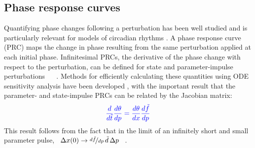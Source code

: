 \documentclass[11pt, letterpaper]{article}
\providecommand{\DIFadd}[1]{{\protect\color{blue}#1}} %
\providecommand{\DIFaddbegin}{} %
\providecommand{\DIFaddend}{} %
\begin{document}
\subsection*{Phase response curves}
Quantifying phase changes following a perturbation has been well studied and is particularly relevant for models of circadian rhythms \cite{Kramer1984, Taylor2008a}.
A phase response curve (PRC) maps the change in phase resulting from the same perturbation applied at \DIFaddbegin \DIFadd{each initial phase}\DIFaddend .
Infinitesimal PRCs, the derivative of the phase change with respect to the perturbation, \DIFaddbegin \DIFadd{can be }\DIFaddend defined for state and parameter-impulse perturbations \DIFaddbegin \DIFadd{\mbox{%
\cite{Taylor2008a}
}%
.
}\DIFaddend Methods for efficiently calculating these quantities using ODE sensitivity analysis have been developed \cite{Taylor2008a}, with the important result that \DIFaddbegin \DIFadd{the parameter- and state-impulse PRCs can be related by the Jacobian matrix:
}\begin{equation}\DIFadd{
  \frac{d}{d\tilde{t}}\frac{d\theta}{dp} = \frac{d\theta}{dx}\frac{d\tilde{f}}{dp} 
  \label{eq:pPRCequiv}
}\end{equation}
\DIFadd{This result follows from the fact that }\DIFaddend in the limit \DIFaddbegin \DIFadd{of an infinitely short and small parameter pulse, \mbox{%
$\Delta x(0) \to \nicefrac{d\tilde{f}}{dp}\,\tilde{d}\, \Delta p$
}%
.
}
\end{document}
